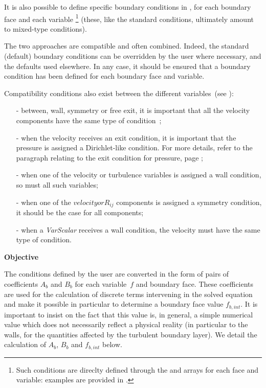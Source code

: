 It is also possible to define specific boundary conditions in
, for each boundary face and each variable
\footnote{Such conditions are direclty defined through the
 and  arrays for each face and variable: examples are provided in
.}
(these, like the standard conditions, ultimately amount to mixed-type conditions).

The two approaches are compatible and often combined.
Indeed, the standard (default) boundary conditions
can be overridden by the user where necessary, and the defaults used elsewhere.
In any case, it should be ensured that a boundary condition has been defined for each
boundary face and variable.

Compatibility conditions also exist between the different
variables~(see ):
\begin{itemize}
\item [-] between, wall, symmetry or free exit, it is important that all the
velocity components have the same type of condition~;
\item [-] when the velocity receives an exit condition, it is important
that the pressure is assigned a Dirichlet-like condition. For more
details, refer to the paragraph relating to the exit condition for
pressure, page \pageref{Base_Condli_Sortie_Pression};
\item [-] when one of the velocity or turbulence variables
is assigned a wall condition, so must all such variables;
\item [-] when one of the $velocity or R_{ij}$ components is assigned a symmetry
condition, it should be the case for all components;
\item [-] when a {\it VarScalar} receives a wall condition, the
velocity must have the same type of condition.
\end{itemize}

\newpage


{\bf Objective}

The conditions defined by the user are
converted in the form of pairs of coefficients $A_b$ and $B_b$
for each variable~$f$ and boundary face. These coefficients
are used for the calculation of
discrete terms intervening in the solved equation and
make it possible in particular to determine a boundary face value
$f_{b,int}$. It is important to insist on the fact
that this value is, in general, a simple numerical value
which does not necessarily reflect a physical reality (in particular
 to the walls, for the quantities affected by the turbulent boundary layer).
We detail the calculation of $A_b$, $B_b$ and $f_{b,int}$ below.

